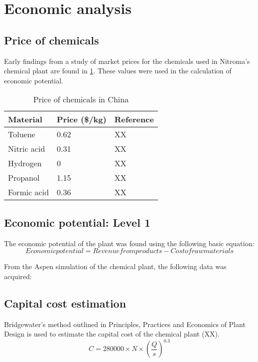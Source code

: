 \section{Economic analysis}
\label{app:economics}
\subsection{Price of chemicals}

Early findings from a study of market prices for the chemicals used in Nitroma's chemical plant are found in \cref{tab:material-prices}. These values were used in the calculation of economic potential.

\begin{table}[h] 
\centering
\caption{Price of chemicals in China}
\label{tab:material-prices}
\begin{tabular}{lll}
    \toprule
    Material    & Price (\$/kg) & Reference \\ \midrule
    Toluene     & 0.62          & XX        \\
    Nitric acid & 0.31          & XX        \\
    Hydrogen    & 0             & XX        \\
    Propanol    & 1.15          & XX        \\
    Formic acid & 0.36          & XX        \\ \bottomrule
\end{tabular}
\end{table}

\subsection{Economic potential: Level 1}
The economic potential of the plant was found using the following basic equation:
\begin{equation}
Economic potential = Revenue from products - Cost of raw materials
\end{equation}

From the Aspen simulation of the chemical plant, the following data was acquired:


\subsection{Capital cost estimation}

Bridgewater's method outlined in Principles, Practices and Economics of Plant Design is used to estimate the capital cost of the chemical plant (XX).
\begin{equation}
    C=280000 \times N \times \left(\frac{Q}{s}\right)^{0.3}
\end{equation}

